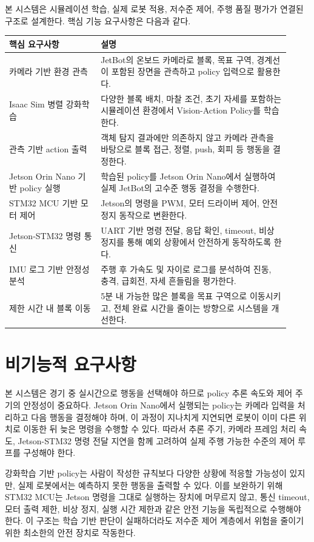 \documentclass[titlepage]{pnureport}
\begin{document}

본 시스템은 시뮬레이션 학습, 실제 로봇 적용, 저수준 제어, 주행 품질 평가가 연결된 구조로 설계한다. 핵심 기능 요구사항은 다음과 같다.

\begin{longtable}{p{0.30\linewidth}p{0.62\linewidth}}
\toprule
핵심 요구사항 & 설명 \\
\midrule
\endhead
카메라 기반 환경 관측 & JetBot의 온보드 카메라로 블록, 목표 구역, 경계선이 포함된 장면을 관측하고 policy 입력으로 활용한다. \\
Isaac Sim 병렬 강화학습 & 다양한 블록 배치, 마찰 조건, 초기 자세를 포함하는 시뮬레이션 환경에서 Vision-Action Policy를 학습한다. \\
관측 기반 action 출력 & 객체 탐지 결과에만 의존하지 않고 카메라 관측을 바탕으로 블록 접근, 정렬, push, 회피 등 행동을 결정한다. \\
Jetson Orin Nano 기반 policy 실행 & 학습된 policy를 Jetson Orin Nano에서 실행하여 실제 JetBot의 고수준 행동 결정을 수행한다. \\
STM32 MCU 기반 모터 제어 & Jetson의 명령을 PWM, 모터 드라이버 제어, 안전 정지 동작으로 변환한다. \\
Jetson-STM32 명령 통신 & UART 기반 명령 전달, 응답 확인, timeout, 비상 정지를 통해 예외 상황에서 안전하게 동작하도록 한다. \\
IMU 로그 기반 안정성 분석 & 주행 후 가속도 및 자이로 로그를 분석하여 진동, 충격, 급회전, 자세 흔들림을 평가한다. \\
제한 시간 내 블록 이동 & 5분 내 가능한 많은 블록을 목표 구역으로 이동시키고, 전체 완료 시간을 줄이는 방향으로 시스템을 개선한다. \\
\bottomrule
\end{longtable}

\section{비기능적 요구사항}

본 시스템은 경기 중 실시간으로 행동을 선택해야 하므로 policy 추론 속도와 제어 주기의 안정성이 중요하다. Jetson Orin Nano에서 실행되는 policy는 카메라 입력을 처리하고 다음 행동을 결정해야 하며, 이 과정이 지나치게 지연되면 로봇이 이미 다른 위치로 이동한 뒤 늦은 명령을 수행할 수 있다. 따라서 추론 주기, 카메라 프레임 처리 속도, Jetson-STM32 명령 전달 지연을 함께 고려하여 실제 주행 가능한 수준의 제어 루프를 구성해야 한다.

강화학습 기반 policy는 사람이 작성한 규칙보다 다양한 상황에 적응할 가능성이 있지만, 실제 로봇에서는 예측하지 못한 행동을 출력할 수 있다. 이를 보완하기 위해 STM32 MCU는 Jetson 명령을 그대로 실행하는 장치에 머무르지 않고, 통신 timeout, 모터 출력 제한, 비상 정지, 실행 시간 제한과 같은 안전 기능을 독립적으로 수행해야 한다. 이 구조는 학습 기반 판단이 실패하더라도 저수준 제어 계층에서 위험을 줄이기 위한 최소한의 안전 장치로 작동한다.
\end{document}
